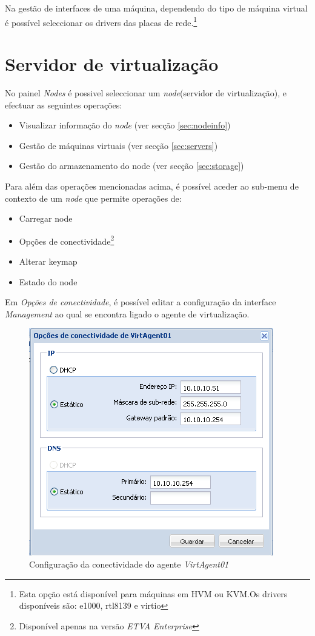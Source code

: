 Na gestão de interfaces de uma máquina, dependendo do tipo de máquina virtual é possível seleccionar os drivers das placas de rede.\footnote{Esta opção está disponível para máquinas em HVM ou KVM.Os drivers disponíveis são: e1000, rtl8139 e virtio}


\section{Servidor de virtualização}
\label{sec:node}

No painel \emph{Nodes} é possivel seleccionar um \emph{node}(servidor de virtualização), e efectuar as seguintes operações:
\begin{itemize}
    \item Visualizar informação do \emph{node} (ver secção \ref{sec:nodeinfo})
    \item Gestão de máquinas virtuais (ver secção \ref{sec:servers})
    \item Gestão do armazenamento do node (ver secção \ref{sec:storage})
\end{itemize}

Para além das operações mencionadas acima, é possível aceder ao sub-menu de contexto de um \emph{node} que permite operações de:
\begin{itemize}
    \item Carregar node
    \item Opções de conectividade\footnote{Disponível apenas na versão \emph{ETVA Enterprise}}
    \item Alterar keymap
    \item Estado do node
\end{itemize}

Em \emph{Opções de conectividade}, é possível editar a configuração da interface \emph{Management} ao qual se encontra ligado o agente de virtualização.
\begin{figure}[H]
	\begin{center}
	\includegraphics[scale=0.5]{screenshots/node_conn.png}
	\caption{Configuração da conectividade do agente \emph{VirtAgent01}}
	\label{fig:node_conn}
	\end{center}
\end{figure}

